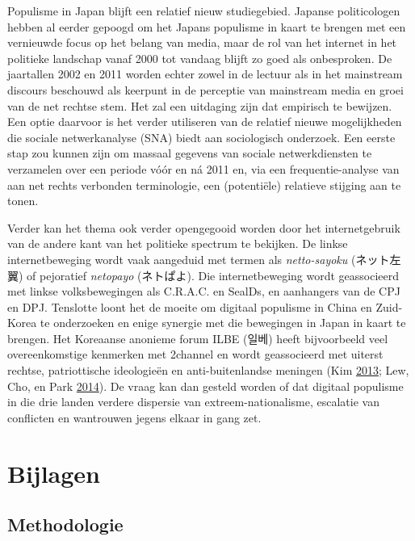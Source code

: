 \documentclass[10.5pt,dutch,]{article}
\begin{document}
Populisme in Japan blijft een relatief nieuw studiegebied. Japanse
politicologen hebben al eerder gepoogd om het Japans populisme in kaart
te brengen met een vernieuwde focus op het belang van media, maar de rol
van het internet in het politieke landschap vanaf 2000 tot vandaag
blijft zo goed als onbesproken. De jaartallen 2002 en 2011 worden echter
zowel in de lectuur als in het mainstream discours beschouwd als
keerpunt in de perceptie van mainstream media en groei van de net
rechtse stem. Het zal een uitdaging zijn dat empirisch te bewijzen. Een
optie daarvoor is het verder utiliseren van de relatief nieuwe
mogelijkheden die sociale netwerkanalyse (SNA) biedt aan sociologisch
onderzoek. Een eerste stap zou kunnen zijn om massaal gegevens van
sociale netwerkdiensten te verzamelen over een periode vóór en ná 2011
en, via een frequentie-analyse van aan net rechts verbonden
terminologie, een (potentiële) relatieve stijging aan te tonen.

Verder kan het thema ook verder opengegooid worden door het
internetgebruik van de andere kant van het politieke spectrum te
bekijken. De linkse internetbeweging wordt vaak aangeduid met termen als
\emph{netto-sayoku} (ネット左翼) of pejoratief \emph{netopayo}
(ネトぱよ). Die internetbeweging wordt geassocieerd met linkse
volksbewegingen als C.R.A.C. en SealDs, en aanhangers van de CPJ en DPJ.
Tenslotte loont het de moeite om digitaal populisme in China en
Zuid-Korea te onderzoeken en enige synergie met die bewegingen in Japan
in kaart te brengen. Het Koreaanse anonieme forum ILBE (일베) heeft
bijvoorbeeld veel overeenkomstige kenmerken met 2channel en wordt
geassocieerd met uiterst rechtse, patriottische ideologieën en
anti-buitenlandse meningen (Kim
\protect\hyperlink{ref-kimux5filbeux5f2013}{2013}; Lew, Cho, en Park
\protect\hyperlink{ref-lewux5fpoliticizationux5f2014}{2014}). De vraag
kan dan gesteld worden of dat digitaal populisme in die drie landen
verdere dispersie van extreem-nationalisme, escalatie van conflicten en
wantrouwen jegens elkaar in gang zet.

\newpage

\appendix

\section{Bijlagen}\label{bijlagen}

\subsection{Methodologie}\label{methodologie}
\end{document}
